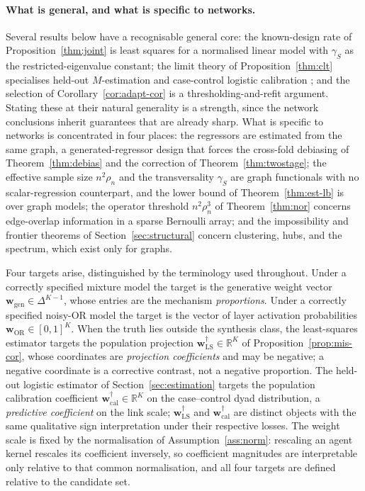 \documentclass[12pt]{article}
\makeatletter
\def\subsection{\@startsection{subsection}{2}{\z@}{-0.13in}{0.03in}{\normalsize\bf\raggedright}}
\newcommand{\R}{\mathbb{R}}
\newcommand{\1}{\mathbf{1}}
\newcommand{\bw}{\mathbf{w}}
\makeatother
\begin{document}
\paragraph{What is general, and what is specific to networks.} Several results below have a recognisable
general core: the known-design rate of Proposition~\ref{thm:joint} is least squares for a normalised linear
model with $\gamma_S$ as the restricted-eigenvalue constant; the limit theory of Proposition~\ref{thm:clt}
specialises held-out $M$-estimation and case-control logistic calibration
\citep{van2000asymptotic,prentice1979logistic}; and the selection of Corollary~\ref{cor:adapt-cor} is a
thresholding-and-refit argument. Stating these at their natural generality is a strength, since the network
conclusions inherit guarantees that are already sharp. What is specific to networks is concentrated in four
places: the regressors are estimated from the same graph, a generated-regressor design that forces the
cross-fold debiasing of Theorem~\ref{thm:debias} and the correction of Theorem~\ref{thm:twostage}; the
effective sample size $n^2\rho_n$ and the transversality $\gamma_S$ are graph functionals with no
scalar-regression counterpart, and the lower bound of Theorem~\ref{thm:est-lb} is over graph models; the
operator threshold $n^2\rho_n^3$ of Theorem~\ref{thm:nor} concerns edge-overlap information in a sparse
Bernoulli array; and the impossibility and frontier theorems of Section~\ref{sec:structural} concern
clustering, hubs, and the spectrum, which exist only for graphs.


\subsection{Estimands}
\label{sec:estimands}
Four targets arise, distinguished by the terminology used throughout. Under a correctly specified
mixture model the target is the generative weight vector $\bw_{\mathrm{gen}}\in\Delta^{K-1}$, whose
entries are the mechanism \emph{proportions}. Under a correctly specified noisy-OR model the target is the vector of layer
activation probabilities $\bw_{\mathrm{OR}}\in[0,1]^K$. When the truth lies outside the synthesis
class, the least-squares estimator targets the population projection
$\bw^\dagger_{\mathrm{LS}}\in\R^K$ of Proposition~\ref{prop:mis-cor}, whose coordinates are
\emph{projection coefficients} and may be negative; a negative coordinate is a corrective
contrast, not a negative proportion. The held-out logistic estimator of
Section~\ref{sec:estimation} targets the population calibration coefficient
$\bw^\dagger_{\mathrm{cal}}\in\R^K$ on the case--control dyad distribution, a \emph{predictive
coefficient} on the link scale; $\bw^\dagger_{\mathrm{LS}}$ and $\bw^\dagger_{\mathrm{cal}}$ are
distinct objects with the same qualitative sign interpretation under their respective losses.
The weight scale is fixed by the
normalisation of Assumption~\ref{ass:norm}: rescaling an agent kernel rescales its coefficient
inversely, so coefficient magnitudes are interpretable only relative to that common normalisation,
and all four targets are defined relative to the candidate set.
\end{document}
